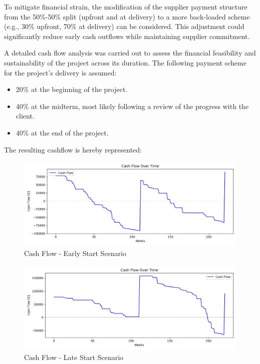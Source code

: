 To mitigate financial strain, the modification of the supplier payment structure from the 50\%-50\% split (upfront and at delivery) to a more back-loaded scheme (e.g., 30\% upfront, 70\% at delivery) can be considered.
This adjustment could significantly reduce early cash outflows while maintaining supplier commitment.

A detailed cash flow analysis was carried out to assess the financial feasibility and sustainability of the project across its duration. The following payment scheme for the project's delivery is assumed:
\begin{itemize}
    \item 20\% at the beginning of the project.
    \item 40\% at the midterm, most likely following a review of the progress with the client.
    \item 40\% at the end of the project.
\end{itemize}

The resulting cashflow is hereby represented:

\begin{figure}[H]
    \centering
    \includegraphics[width=\textwidth]{../cash_flow_E.png}
    \caption{Cash Flow - Early Start Scenario}
    \label{fig:cashflow_early}

\end{figure}
\begin{figure}[H]
    \centering
    \includegraphics[width=\textwidth]{../cash_flow_L.png}
    \caption{Cash Flow - Late Start Scenario}
    \label{fig:cashflow_late}
\end{figure}

